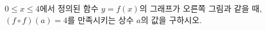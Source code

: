 \hspace*{2mm}\begin{minipage}[t]{\dimexpr\linewidth-2mm\relax}\vspace{0pt}
\noindent\begin{minipage}[t]{0.58\linewidth}\vspace{0pt}\raggedright $0\le x\le 4$에서 정의된 함수 $y=f(x)$의 그래프가 오른쪽 그림과 같을 때, $(f\circ f)(a)=4$를 만족시키는 상수 $a$의 값을 구하시오.\end{minipage}\hfill\begin{minipage}[t]{0.4\linewidth}\vspace{0pt}\centering \resizebox{\ifdim\width>\linewidth\linewidth\else\width\fi}{!}{}\end{minipage}\par\end{minipage}
